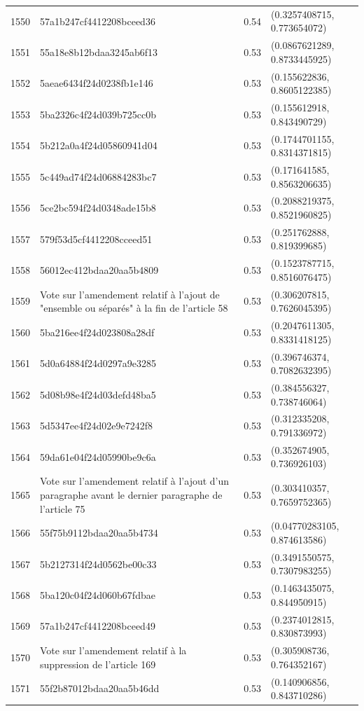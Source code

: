 \begin{table}[ht]
\begin{tabular}{rlrl}
  1550 & 57a1b247cf4412208bceed36 & 0.54 & (0.3257408715, 0.773654072) \\ 
  1551 & 55a18e8b12bdaa3245ab6f13 & 0.53 & (0.0867621289, 0.8733445925) \\ 
  1552 & 5aeae6434f24d0238fb1e146 & 0.53 & (0.155622836, 0.8605122385) \\ 
  1553 & 5ba2326c4f24d039b725cc0b & 0.53 & (0.155612918, 0.843490729) \\ 
  1554 & 5b212a0a4f24d05860941d04 & 0.53 & (0.1744701155, 0.8314371815) \\ 
  1555 & 5c449ad74f24d06884283bc7 & 0.53 & (0.171641585, 0.8563206635) \\ 
  1556 & 5ce2bc594f24d0348ade15b8 & 0.53 & (0.2088219375, 0.8521960825) \\ 
  1557 & 579f53d5cf4412208cceed51 & 0.53 & (0.251762888, 0.819399685) \\ 
  1558 & 56012ec412bdaa20aa5b4809 & 0.53 & (0.1523787715, 0.8516076475) \\ 
  1559 & Vote sur l'amendement relatif à l'ajout de "ensemble ou séparés" à la fin de l'article 58 & 0.53 & (0.306207815, 0.7626045395) \\ 
  1560 & 5ba216ee4f24d023808a28df & 0.53 & (0.2047611305, 0.8331418125) \\ 
  1561 & 5d0a64884f24d0297a9e3285 & 0.53 & (0.396746374, 0.7082632395) \\ 
  1562 & 5d08b98e4f24d03defd48ba5 & 0.53 & (0.384556327, 0.738746064) \\ 
  1563 & 5d5347ee4f24d02e9e7242f8 & 0.53 & (0.312335208, 0.791336972) \\ 
  1564 & 59da61e04f24d05990be9c6a & 0.53 & (0.352674905, 0.736926103) \\ 
  1565 & Vote sur l'amendement relatif à l'ajout d'un paragraphe avant le dernier paragraphe de l'article 75 & 0.53 & (0.303410357, 0.7659752365) \\ 
  1566 & 55f75b9112bdaa20aa5b4734 & 0.53 & (0.04770283105, 0.874613586) \\ 
  1567 & 5b2127314f24d0562be00c33 & 0.53 & (0.3491550575, 0.7307983255) \\ 
  1568 & 5ba120c04f24d060b67fdbae & 0.53 & (0.1463435075, 0.844950915) \\ 
  1569 & 57a1b247cf4412208bceed49 & 0.53 & (0.2374012815, 0.830873993) \\ 
  1570 & Vote sur l'amendement relatif à la suppression de l'article 169 & 0.53 & (0.305908736, 0.764352167) \\ 
  1571 & 55f2b87012bdaa20aa5b46dd & 0.53 & (0.140906856, 0.843710286) \\ 

\end{tabular}
\end{table}

